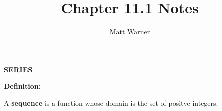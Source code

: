 \documentclass{report}
\title{\Huge{Chapter 11.1 Notes}}
\author{\huge{Matt Warner}}
\date{\huge{}}
\begin{document}
	\maketitle
	\begin{LARGE}
		\begin{center}
		\noindent \textbf{SERIES}
		\end{center}
	\end{LARGE}
\bigbreak \noindent \bigbreak \noindent \bigbreak \noindent

\begin{comment}

  ⠀⠀⠀⠀⠀⠀⠀⠀⠀⠀⠀⠀⠀⠀⠀⢀⣀⡤⠤⠤⠤⠤⠤⠤⣤⣀⣀⡀⠀⠀⠀⠀⠀⠀⠀⠀⠀⠀⠀⠀⠀⠀⠀⠀
⠀⠀⠀⠀⠀⠀⠀⠀⠀⠀⠀⠀⠀⢀⡤⠚⠁⠀⠀⠀⠀⠀⠀⠀⠀⠀⠀⠀⠉⠑⢦⡀⠀⠀⠀⠀⠀⠀⠀⠀⠀⠀⠀⠀⠀
⠀⠀⠀⠀⠀⠀⠀⠀⠀⢀⣠⠴⠚⠁⠀⠀⠀⠀⠀⠀⠀⠀⠀⠀⠀⠀⠀⠀⠀⠀⠀⠉⠒⢦⡀⠀⠀⠀⠀⠀⠀⠀⠀⠀⠀
⠀⠀⠀⠀⠀⠀⢀⡤⠖⠋⠀⠀⠀⠀⠀⠀⠀⠀⠀⠀⠀⠀⠀⠀⠀⠀⠀⠀⠀⠀⠀⠀⠀⠀⠙⢦⠀⠀⠀⠀⠀⠀⠀⠀⠀
⠀⠀⠀⠀⢀⡴⠋⠀⠀⠀⠀⠀⠀⠀⠀⠀⠀⠀⠀⠀⣀⡤⠤⠤⠶⠶⠤⠤⠤⠤⢤⣀⡀⠀⠀⠀⡇⠀⠀⠀⠀⠀⠀⠀⠀
⠀⠀⠀⠀⡾⠀⠀⠀⠀⠀⠀⠀⠀⠀⠀⢀⣠⠴⠚⠉⠁⠀⠀⠀⠀⠀⠀⠀⠀⠀⠀⠀⠉⠙⠦⣄⡇⠀⠀⠀⠀⠀⠀⠀⠀
⠀⠀⢀⡜⠁⠀⠀⠀⠀⠀⠀⠀⠀⣠⠔⠋⠀⠀⠀⠀⠀⠀⠀⠀⢠⠀⠀⠀⠀⠀⠀⠀⠀⠰⢄⣀⡹⢦⡀⠀⠀⠀⠀⠀⠀
⠀⢀⡞⠀⠀⠀⠀⠀⠀⠀⠀⣠⠞⠁⠀⠀⠀⠀⠀⠀⠀⣀⣠⠔⠋⠀⠀⠀⠀⠀⠀⠀⠀⠀⠀⡠⠖⠊⠉⠉⠐⠦⡀⠀⠀
⢀⡞⠀⠀⠀⠀⠀⠀⠀⢀⡼⠁⠀⠀⠀⠀⠀⠀⠀⠐⢋⣀⠤⠤⠤⠤⣀⠀⠀⠀⠀⠀⠀⢠⠎⠀⠀⠀⠀⠀⠀⠀⠈⢢⠀
⢸⠀⠀⠀⠀⠀⠀⠀⢀⡞⠀⠀⠀⠀⠀⠀⠀⠀⢠⠖⠉⠀⠀⠀⠀⠀⠀⠉⠢⡀⠀⠀⠀⡎⠀⠀⠀⠀⠀⠀⠀⢀⡀⠀⢣
⣼⠀⠀⠀⠀⠀⠀⠀⡼⠀⠀⠀⠀⠀⠀⠀⠀⡰⠁⠀⠀⠀⠀⠀⠀⠀⠀⠀⠀⠙⡄⠀⠀⡇⠀⠀⠀⠀⠀⠀⠀⠈⠀⠀⢸
⢿⠀⠀⠀⠀⠀⠀⢠⠇⠀⠀⠀⠀⠀⠀⠀⠀⡇⠀⠀⠀⡀⠀⠀⠀⠀⠀⠀⠀⠀⠃⠀⠀⢣⠀⠀⠀⠀⠀⠀⠀⠀⠀⠀⣸
⢸⠀⠀⠀⠀⠀⠀⣼⠀⠀⠀⠀⠀⠀⠀⠀⠀⡇⠀⠀⠘⠃⠀⠀⠀⠀⠀⠀⠀⠀⡆⠀⠀⠈⢣⡀⠀⠀⠀⠀⠀⠀⠀⡴⣧
⢸⠀⠀⠀⠀⠀⠀⡏⠀⠀⠀⠀⠀⠀⠀⠀⠀⢣⠀⠀⠀⠀⠀⠀⠀⠀⠀⠀⠀⣰⠁⠀⠀⠀⠀⣈⠓⠦⠤⠤⠤⠒⠉⠀⢸
⢸⠀⠀⠀⠀⠀⠀⡇⠀⠀⠀⠀⠀⠀⠀⠀⠀⠈⠣⣀⠀⠀⠀⠀⠀⠀⠀⣠⠔⠁⠀⠀⠀⠀⠀⠀⠑⡄⠀⠀⠀⠀⠀⠀⢸
⢸⡀⠀⠀⠀⠀⠀⡇⠀⠀⠀⠀⠀⠀⠀⠀⠀⠀⠀⠈⠙⠒⠒⠔⠒⠒⠉⠀⠀⠀⠀⠀⠀⠒⠠⠤⠚⠀⠀⠀⠀⠀⠀⠀⢸
⠀⠳⣄⠀⠀⠀⠀⢷⠀⠀⠀⡀⠀⠀⠀⠀⠀⠀⠀⠀⠀⠀⠀⠀⠀⠀⠀⠀⠀⠀⠀⠀⠀⠀⠀⠀⠀⠀⠀⠀⠀⠀⠀⠀⡼
⠀⠀⠈⠳⡀⠀⠀⠸⣆⡴⠋⠁⠀⠀⠀⠀⠀⠀⠀⠀⠀⠀⠀⠀⠀⠀⠀⠀⠀⠀⠀⠀⠀⠀⠈⡆⠀⠀⠀⠀⠀⠀⠀⢰⠇
⠀⠀⠀⠀⠳⡀⠀⠀⢻⠀⠀⠀⠀⠀⠀⠀⠀⠀⠀⠀⠀⠀⠀⠀⠀⠀⠀⠀⠀⠀⠀⠀⠀⠀⡀⢸⠀⠀⠀⠀⠀⠀⢀⠏⠀
⠀⠀⠀⠀⠀⠙⠲⢤⣼⡄⠀⠀⠀⠀⠀⠀⠀⠀⠀⠀⠀⠀⠀⠀⠀⠀⠀⠀⠀⠀⠀⠘⣆⠀⡗⠞⠀⠀⠀⠀⠀⣠⠏⠀⠀
⠀⠀⠀⠀⠀⠀⠀⠀⠀⠈⠲⢤⡤⠤⠄⠀⠀⠀⠀⠀⠀⠀⠀⠀⠀⠀⠀⠀⠀⠀⠀⠀⠈⠒⠃⠀⠀⠀⠀⢀⡴⠃⠀⠀⠀
⠀⠀⠀⠀⠀⠀⠀⠀⠀⠀⠀⠀⠙⢦⡀⠀⠀⠀⠀⠀⠀⠀⠀⠀⠀⠀⠀⠀⠀⠀⠀⠀⠀⠀⠀⠀⠀⢀⡴⠋⠀⠀⠀⠀⠀
⠀⠀⠀⠀⠀⠀⠀⠀⠀⠀⠀⠀⠀⠀⠙⠢⣄⡀⠀⠀⠀⠀⠀⠀⠀⠀⠀⠀⠀⠀⠀⠀⠀⢀⣀⡤⠒⠉⠀⠀⠀⠀⠀⠀⠀
⠀⠀⠀⠀⠀⠀⠀⠀⠀⠀⠀⠀⠀⠀⠀⠀⠀⠉⠙⠒⠦⠤⢤⣤⣤⠤⠤⠤⠤⠴⠖⠒⠛⠉⠀⠀⠀⠀⠀⠀⠀⠀⠀⠀⠀⠀

\end{comment}

\begin{LARGE}
	\noindent \textbf{Definition:}
\end{LARGE}
\bigbreak \noindent 

\begin{Large}
\noindent A \textbf{sequence} is a function whose domain is the set of positve integers. 
\end{Large}
\vspace{5mm}
\end{document}
